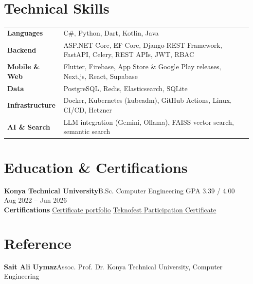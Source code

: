 \documentclass[10pt,a4paper]{extarticle}
\newcommand{\sep}{\;\textperiodcentered\;}
\begin{document}
\section{Technical Skills}
\renewcommand{\arraystretch}{1.02}
\noindent\begin{tabular}{@{}>{\raggedright\arraybackslash}p{}@{}>{\raggedright\arraybackslash}p{}@{}}
\textbf{Languages} & C\#, Python, Dart, Kotlin, Java\\
\textbf{Backend} & ASP.NET Core, EF Core, Django REST Framework, FastAPI, Celery, REST APIs, JWT, RBAC\\
\textbf{Mobile \& Web} & Flutter, Firebase, App Store \& Google Play releases, Next.js, React, Supabase\\
\textbf{Data} & PostgreSQL, Redis, Elasticsearch, SQLite\\
\textbf{Infrastructure} & Docker, Kubernetes (kubeadm), GitHub Actions, Linux, CI/CD, Hetzner\\
\textbf{AI \& Search} & LLM integration (Gemini, Ollama), FAISS vector search, semantic search\\
\end{tabular}

\section{Education \& Certifications}
\noindent\textbf{Konya Technical University}\sep B.Sc. Computer Engineering {\color{muted}\sep GPA 3.39 / 4.00}
\hfill {\color{muted}Aug 2022 -- Jun 2026}\\[3pt]
\noindent\textbf{Certifications}\quad
\href{https://drive.google.com/file/d/1btYql9fKCvBwqHeh06F_NE257FhceNCB/view}{Certificate portfolio}\sep
\href{https://drive.google.com/file/d/12AcWLnSGEfcZUWUb945n6nD-iPB7aIA9/view?usp=sharing}{Teknofest Participation Certificate}

\section{Reference}
\noindent\textbf{Sait Ali Uymaz}\sep Assoc. Prof. Dr. {\color{muted}\sep Konya Technical University, Computer Engineering}
\end{document}
